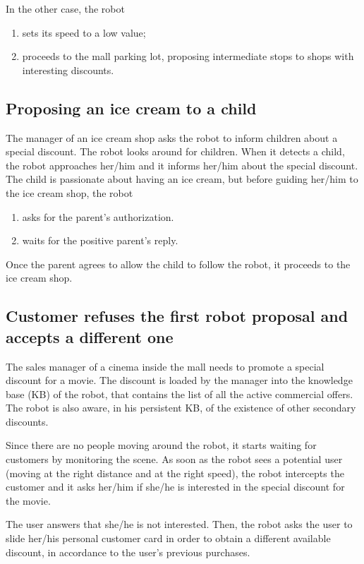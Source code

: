 \noindent In the other case, the robot
\begin{enumerate}
\item sets its speed to a low value;
\item proceeds to the mall parking lot, proposing intermediate stops to shops
with interesting discounts.
\end{enumerate}


\subsection{Proposing an ice cream to a child}

The manager of an ice cream shop asks the robot to inform children about
a special discount. The robot looks around for children. When it detects
a child, the robot approaches her/him and it informs her/him
about the special discount. The child
is passionate about having an ice cream, but before guiding her/him
to the ice cream shop, the robot
\begin{enumerate}
\item asks for the parent's authorization.
\item waits for the positive parent's reply.
\end{enumerate}

\noindent Once the parent agrees to allow the child to follow the robot, it proceeds
to the ice cream shop. 


\subsection{Customer refuses the first robot proposal and accepts a different one}

The sales manager of a cinema inside the mall needs to promote a special discount
for a movie. The discount is loaded by the manager into the 
knowledge base (KB) of the robot, that contains the list of all the active commercial offers.
The robot is also aware, in his persistent KB, of the
existence of other secondary discounts.

Since there are no people moving around the robot, it starts
waiting for customers by monitoring the scene. As soon as the robot
sees a potential user (moving at the right distance and at the right speed),
the robot intercepts the customer and it asks her/him if she/he is interested
in the special discount for the movie.

The user answers that she/he is not interested.
Then, the robot asks the user to slide her/his personal customer card in order to
obtain a different available discount, in accordance to the user's previous purchases.

